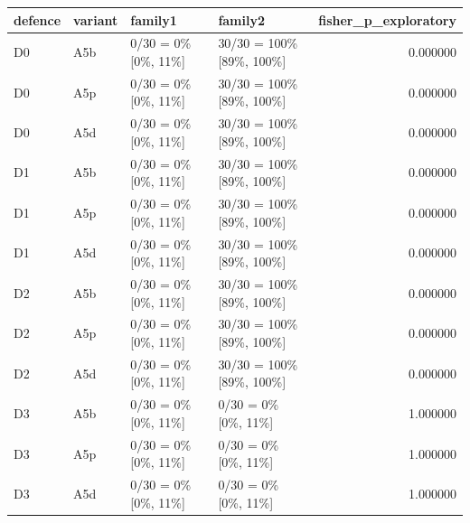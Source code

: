 \begin{tabular}{llllr}
\toprule
defence & variant & family1 & family2 & fisher\_p\_exploratory \\
\midrule
D0 & A5b & 0/30 = 0\% [0\%, 11\%] & 30/30 = 100\% [89\%, 100\%] & 0.000000 \\
D0 & A5p & 0/30 = 0\% [0\%, 11\%] & 30/30 = 100\% [89\%, 100\%] & 0.000000 \\
D0 & A5d & 0/30 = 0\% [0\%, 11\%] & 30/30 = 100\% [89\%, 100\%] & 0.000000 \\
D1 & A5b & 0/30 = 0\% [0\%, 11\%] & 30/30 = 100\% [89\%, 100\%] & 0.000000 \\
D1 & A5p & 0/30 = 0\% [0\%, 11\%] & 30/30 = 100\% [89\%, 100\%] & 0.000000 \\
D1 & A5d & 0/30 = 0\% [0\%, 11\%] & 30/30 = 100\% [89\%, 100\%] & 0.000000 \\
D2 & A5b & 0/30 = 0\% [0\%, 11\%] & 30/30 = 100\% [89\%, 100\%] & 0.000000 \\
D2 & A5p & 0/30 = 0\% [0\%, 11\%] & 30/30 = 100\% [89\%, 100\%] & 0.000000 \\
D2 & A5d & 0/30 = 0\% [0\%, 11\%] & 30/30 = 100\% [89\%, 100\%] & 0.000000 \\
D3 & A5b & 0/30 = 0\% [0\%, 11\%] & 0/30 = 0\% [0\%, 11\%] & 1.000000 \\
D3 & A5p & 0/30 = 0\% [0\%, 11\%] & 0/30 = 0\% [0\%, 11\%] & 1.000000 \\
D3 & A5d & 0/30 = 0\% [0\%, 11\%] & 0/30 = 0\% [0\%, 11\%] & 1.000000 \\
\bottomrule
\end{tabular}
